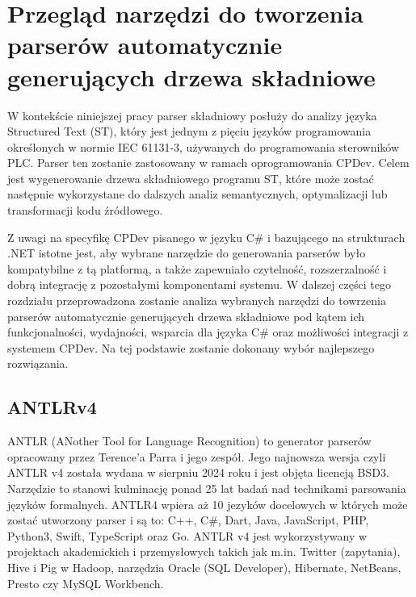 \documentclass[12pt,twoside]{article}
\begin{document}
\section{Przegląd narzędzi do tworzenia parserów automatycznie generujących drzewa składniowe}

W kontekście niniejszej pracy parser składniowy posłuży do analizy języka Structured Text (ST), który jest jednym z pięciu języków programowania określonych w normie IEC 61131-3, używanych do programowania sterowników PLC. Parser ten zostanie zastosowany w ramach oprogramowania CPDev. Celem jest wygenerowanie drzewa składniowego programu ST, które może zostać następnie wykorzystane do dalszych analiz semantycznych, optymalizacji lub transformacji kodu źródłowego.

Z uwagi na specyfikę CPDev  pisanego w języku C\# i bazującego na strukturach .NET  istotne jest, aby wybrane narzędzie do generowania parserów było kompatybilne z tą platformą, a także zapewniało czytelność, rozszerzalność i dobrą integrację z pozostałymi komponentami systemu. W dalszej części tego rozdziału przeprowadzona zostanie analiza wybranych narzędzi do towrzenia parserów automatycznie generujących drzewa składniowe pod kątem ich funkcjonalności, wydajności, wsparcia dla języka C\# oraz możliwości integracji z systemem CPDev. Na tej podstawie zostanie dokonany wybór najlepszego rozwiązania.
\subsection{ANTLRv4}

ANTLR (ANother Tool for Language Recognition) to generator parserów opracowany przez Terence'a Parra i jego zespół. Jego najnowsza wersja czyli ANTLR v4 została wydana w sierpniu 2024 roku i jest objęta licencją BSD3. Narzędzie to stanowi kulminację ponad 25 lat badań nad technikami parsowania języków formalnych. ANTLR4 wpiera aż 10 jezyków docelowych w których może zostać utworzony parser i są to: C++, C\#, Dart, Java, JavaScript, PHP, Python3, Swift, TypeScript oraz Go.\cite{antlr4GitHub} ANTLR v4 jest wykorzystywany w projektach akademickich i przemysłowych takich jak m.in. Twitter (zapytania), Hive i Pig w Hadoop, narzędzia Oracle (SQL Developer), Hibernate, NetBeans, Presto czy MySQL Workbench.\cite{antlr4Org}
\end{document}
